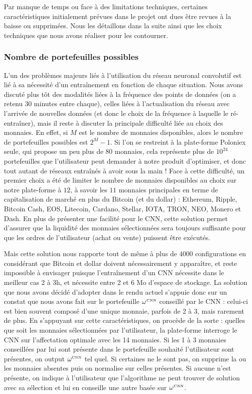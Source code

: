 \documentclass[a4paper, 10pt]{article}
\begin{document}
Par manque de temps ou face à des limitations techniques, certaines caractéristiques initialement prévues dans le projet ont dues être revues à la baisse ou supprimées. Nous les détaillons dans la suite ainsi que les choix techniques que nous avons réaliser pour les contourner.

\subsubsection{Nombre de portefeuilles possibles}

L'un des problèmes majeurs liés à l'utilisation du réseau neuronal convolutif est lié à sa nécessité d'un entraînement en fonction de chaque situation. Nous avons discuté plus tôt des modalités liées à la fréquence des points de données (on a retenu 30 minutes entre chaque), celles liées à l'actualisation du réseau avec l'arrivée de nouvelles données (et donc le choix de la fréquence à laquelle le ré-entraîner), mais il reste à discuter la principale difficulté liée au choix des monnaies. En effet, si $M$ est le nombre de monnaies disponibles, alors le nombre de portefeuilles possibles est $2^M - 1$. Si l'on se restreint à la plate-forme Poloniex seule, qui propose un peu plus de 80 monnaies, cela représente plus de $10^{24}$ portefeuilles que l'utilisateur peut demander à notre produit d'optimiser, et donc tout autant de réseaux entraînés à avoir sous la main ! Face à cette difficulté, un premier choix a été de limiter le nombre de monnaies disponibles au choix sur notre plate-forme à $12$, à savoir les $11$ monnaies principales en terme de capitalisation de marché en plus du Bitcoin (et du dollar) : Ethereum, Ripple, Bitcoin Cash, EOS, Litecoin, Cardano, Stellar, IOTA, TRON, NEO, Monero et Dash. En plus de présenter une facilité pour le CNN, cette solution permet d'assurer que la liquidité des monnaies sélectionnées sera toujours suffisante pour que les ordres de l'utilisateur (achat ou vente) puissent être exécutés.

Mais cette solution nous rapporte tout de même à plus de $4000$ configurations en considérant que Bitcoin et dollar doivent nécessairement y apparaître, et reste impossible à envisager puisque l'entraînement d'un CNN nécessite dans le meilleur cas 2 à 3h, et nécessite entre 2 et 6 Mo d'espace de stockage. La solution que nous avons décidé d'adopter dans le rendu actuel s'appuie donc sur un constat que nous avons fait sur le portefeuille $\omega^{\text{\tiny CNN}}$ conseillé par le CNN : celui-ci est bien souvent composé d'une unique monnaie, parfois de 2 à 3, mais rarement de plus. En s'appuyant sur cette caractéristiques, on procède de la sorte : quelles que soit les monnaies sélectionnées par l'utilisateur, la plate-forme interroge le CNN sur l'affectation optimale avec les 14 monnaies. Si les 1 à 3 monnaies conseillées par lui sont présente dans le portefeuille souhaité l'utilisateur sont présentes, on output $\omega^{\text{\tiny CNN}}$ tel quel. Si certaines ne le sont pas, on supprime la ou les monnaies absentes puis on normalise sur celles présentes. Si aucune n'est présente, on indique à l'utilisateur que l'algorithme ne peut trouver de solution avec sa sélection et lui en conseille une autre basée sur $\omega^{\text{\tiny CNN}}$.
\end{document}
